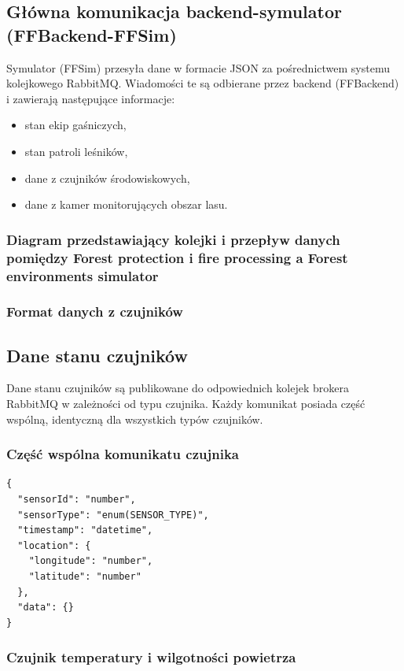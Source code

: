 \documentclass[11pt,a4paper]{article}
\begin{document}
\subsection{Główna komunikacja backend-symulator (FFBackend-FFSim) }
Symulator (FFSim) przesyła dane w formacie JSON za pośrednictwem systemu kolejkowego RabbitMQ. Wiadomości te są odbierane przez backend (FFBackend) i zawierają następujące informacje:
\begin{itemize}
    \item stan ekip gaśniczych,
    \item stan patroli leśników,
    \item dane z czujników środowiskowych,
    \item dane z kamer monitorujących obszar lasu.
\end{itemize}

\subsubsection{ Diagram przedstawiający kolejki i przepływ danych pomiędzy Forest protection i fire processing a Forest environments simulator}

\subsubsection{Format danych z czujników }

\subsection{Dane stanu czujników}

Dane stanu czujników są publikowane do odpowiednich kolejek brokera RabbitMQ w zależności od typu czujnika. Każdy komunikat posiada część wspólną, identyczną dla wszystkich typów czujników.

\subsubsection*{Część wspólna komunikatu czujnika}

\begin{verbatim}
{
  "sensorId": "number",
  "sensorType": "enum(SENSOR_TYPE)",
  "timestamp": "datetime",
  "location": {
    "longitude": "number",
    "latitude": "number"
  },
  "data": {}
}
\end{verbatim}

\subsubsection*{Czujnik temperatury i wilgotności powietrza}
\end{document}
